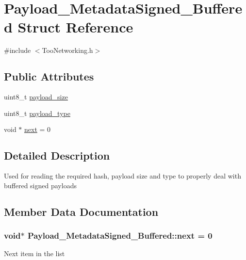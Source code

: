 \hypertarget{structPayload__MetadataSigned__Buffered}{}\section{Payload\+\_\+\+Metadata\+Signed\+\_\+\+Buffered Struct Reference}
\label{structPayload__MetadataSigned__Buffered}


{\ttfamily \#include $<$Too\+Networking.\+h$>$}

\subsection*{Public Attributes}
\begin{DoxyCompactItemize}
\item 
uint8\+\_\+t \hyperlink{structPayload__MetadataSigned__Buffered_a7c8d197be9b17df157c235590f6687bf}{payload\+\_\+size}
\item 
uint8\+\_\+t \hyperlink{structPayload__MetadataSigned__Buffered_a2722ee42fee988e9274b2af780431bde}{payload\+\_\+type}
\item 
void $\ast$ \hyperlink{structPayload__MetadataSigned__Buffered_aa7a25d1e9144285ab92d22b3d6a5db46}{next} = 0
\end{DoxyCompactItemize}


\subsection{Detailed Description}
Used for reading the required hash, payload size and type to properly deal with buffered signed payloads 

\subsection{Member Data Documentation}
\subsubsection[{\texorpdfstring{next}{next}}]{\setlength{\rightskip}{0pt plus 5cm}void$\ast$ Payload\+\_\+\+Metadata\+Signed\+\_\+\+Buffered\+::next = 0}\hypertarget{structPayload__MetadataSigned__Buffered_aa7a25d1e9144285ab92d22b3d6a5db46}{}\label{structPayload__MetadataSigned__Buffered_aa7a25d1e9144285ab92d22b3d6a5db46}
Next item in the list 
